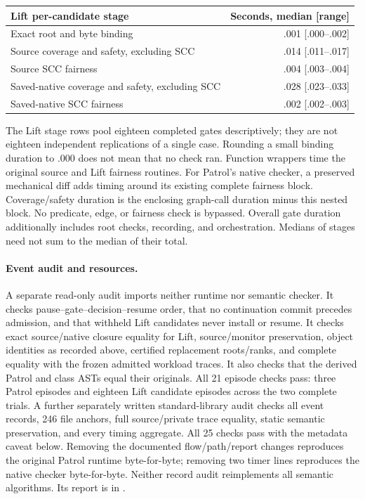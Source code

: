 \begin{center}\small
\begin{tabular}{@{}L{105mm}r@{}}\toprule
Lift per-candidate stage & Seconds, median [range]\\\midrule
Exact root and byte binding & .001 [.000--.002]\\
Source coverage and safety, excluding SCC & .014 [.011--.017]\\
Source SCC fairness & .004 [.003--.004]\\
Saved-native coverage and safety, excluding SCC & .028 [.023--.033]\\
Saved-native SCC fairness & .002 [.002--.003]\\\bottomrule
\end{tabular}
\end{center}
The Lift stage rows pool eighteen completed gates descriptively; they
are not eighteen independent replications of a single case. Rounding a
small binding duration to .000 does not mean that no check ran.
Function wrappers time the original source and Lift fairness routines.
For Patrol's native checker, a preserved mechanical diff adds timing
around its existing complete fairness block. Coverage/safety duration is
the enclosing graph-call duration minus this nested block. No predicate,
edge, or fairness check is bypassed. Overall gate duration additionally
includes root checks, recording, and orchestration. Medians of stages
need not sum to the median of their total.

\paragraph{Event audit and resources.}
A separate read-only audit imports neither runtime nor semantic checker.
It checks pause--gate--decision--resume order, that no continuation commit
precedes admission, and that withheld Lift candidates never install or
resume. It checks exact source/native closure equality for Lift,
source/monitor preservation, object identities as recorded above,
certified replacement roots/ranks, and complete equality with the frozen
admitted workload traces. It also checks that the derived Patrol
 and  class ASTs equal their originals.
All 21 episode checks pass: three Patrol episodes and eighteen Lift
candidate episodes across the two complete trials. A further separately
written standard-library audit checks all event records, 246 file anchors,
full source/private trace equality, static semantic preservation, and
every timing aggregate. All 25 checks pass with the metadata caveat
below. Removing the documented flow/path/report changes reproduces the
original Patrol runtime byte-for-byte; removing two timer lines reproduces
the native checker byte-for-byte. Neither record audit reimplements all
semantic algorithms. Its report is in .

